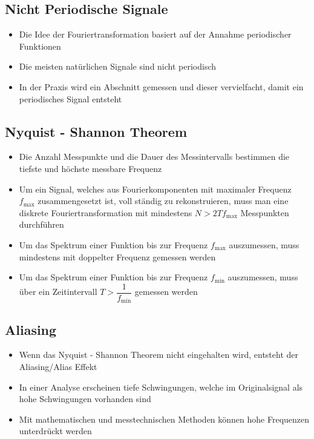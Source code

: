 \documentclass[8pt,a4paper]{scrartcl}
\begin{document}
\begin{multicols*}{3}
						\subsection{Nicht Periodische Signale}		
							\begin{itemize}\itemsep0pt
								\item Die Idee der Fouriertransformation basiert auf der Annahme periodischer Funktionen
								\item Die meisten natürlichen Signale sind nicht periodisch
								\item In der Praxis wird ein Abschnitt gemessen und dieser vervielfacht, damit ein periodisches Signal entsteht
								
							\end{itemize}	
							
						\subsection{Nyquist - Shannon Theorem}		
							\begin{itemize}\itemsep0pt
								\item Die Anzahl Messpunkte und die Dauer des Messintervalls bestimmen die tiefste und höchste messbare Frequenz
								\item Um ein Signal, welches aus Fourierkomponenten mit maximaler Frequenz $f_{\text{max}}$ zusammengesetzt ist, voll ständig zu rekonstruieren, muss man eine diskrete Fouriertransformation mit mindestens \textbf{$N >2Tf_{\text{max}}$} Messpunkten durchführen
								\item Um das Spektrum einer Funktion bis zur Frequenz $f_{\text{max}}$ auszumessen, muss mindestens mit doppelter Frequenz gemessen werden
								\item Um das Spektrum einer Funktion bis zur Frequenz $f_{\text{min}}$ auszumessen, muss über ein Zeitintervall $T > \dfrac{1}{f_{\text{min}}}$ gemessen werden
							\end{itemize}	
							
						\subsection{Aliasing}		
							\begin{itemize}\itemsep0pt
								\item Wenn das Nyquist - Shannon Theorem nicht eingehalten wird, entsteht der Aliasing/Alias Effekt
								\item In einer Analyse erscheinen tiefe Schwingungen, welche im Originalsignal als hohe Schwingungen vorhanden sind
								\item Mit mathematischen und messtechnischen Methoden können hohe Frequenzen unterdrückt werden
							\end{itemize}	
						

\end{multicols*}
\end{document}
